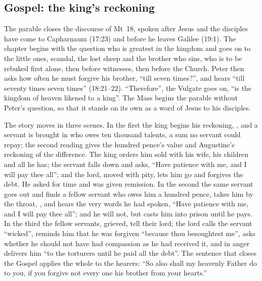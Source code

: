 \subsection{Gospel: the king's reckoning}

The parable closes the discourse of Mt~18, spoken after Jesus and the disciples
have come to Capharnaum (17:23) and before he leaves Galilee (19:1). The
chapter begins with the question who is greatest in the kingdom and goes on to
the little ones, scandal, the lost sheep and the brother who sins, who is to be
rebuked first alone, then before witnesses, then before the Church. Peter then
asks how often he must forgive his brother, ``till seven times?'', and hears
``till seventy times seven times'' (18:21--22). ``Therefore'', the Vulgate
goes on, ``is the kingdom of heaven likened to a king''. The Mass begins
the parable without Peter's question, so that it stands on its own as a word of
Jesus to his disciples.

The story moves in three scenes. In the first the king begins his reckoning,
, and a servant is brought in who owes ten thousand
talents, a sum no servant could repay; the second reading gives the hundred
pence's value and Augustine's reckoning of the difference. The king orders him sold with his wife,
his children and all he has; the servant falls down and asks, ``Have patience
with me, and I will pay thee all''; and the lord, moved with pity, lets him go and
forgives the debt. He asked for time and was given remission. In the second the
same servant goes out and finds a fellow servant who owes him a hundred pence,
takes him by the throat, , and hears the very words he had
spoken, ``Have patience with me, and I will pay thee all''; and he will not, but
casts him into prison until he pays. In the third the fellow servants, grieved,
tell their lord; the lord calls the servant ``wicked'', reminds him that he was
forgiven ``because thou besoughtest me'', asks whether he should not have had
compassion as he had received it, and in anger delivers him ``to the torturers
until he paid all the debt''. The sentence that closes the Gospel applies the
whole to the hearers: ``So also shall my heavenly Father do to you, if you
forgive not every one his brother from your hearts.''

